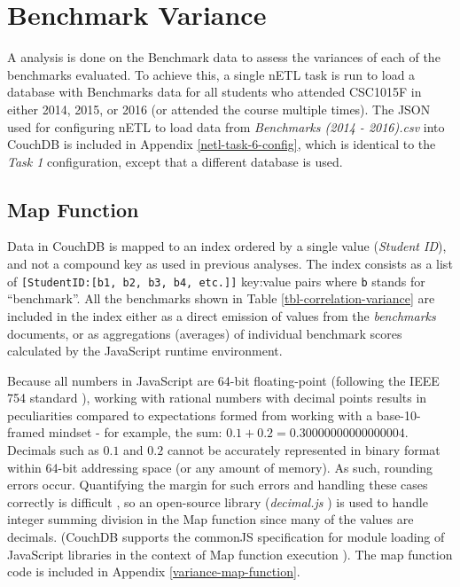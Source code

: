 \section{Benchmark Variance}
A  analysis is done on the Benchmark data to assess the variances of each of the benchmarks evaluated. To achieve this, a single nETL task is run to load a database with Benchmarks data for all students who attended CSC1015F in either 2014, 2015, or 2016 (or attended the course multiple times). The JSON used for configuring nETL to load data from \textit{Benchmarks (2014 - 2016).csv} into CouchDB is included in Appendix \ref{netl-task-6-config}, which is identical to the \textit{Task 1} configuration, except that a different database is used.

\subsection{Map Function}
Data in CouchDB is mapped to an index ordered by a single value (\textit{Student ID}), and not a compound key as used in previous analyses. The index consists as a list of \texttt{[StudentID:[b1, b2, b3, b4, etc.]]} key:value pairs where \texttt{b} stands for ``benchmark''. All the benchmarks shown in Table \ref{tbl-correlation-variance} are included in the index either as a direct emission of values from the \textit{benchmarks} documents, or as aggregations (averages) of individual benchmark scores calculated by the JavaScript runtime environment.

Because all numbers in JavaScript are 64-bit floating-point (following the IEEE 754 standard \cite{floatingPoint}), working with rational numbers with decimal points results in peculiarities compared to expectations formed from working with a base-10-framed mindset - for example, the sum: $0.1 + 0.2 = 0.30000000000000004$. Decimals such as $0.1$ and $0.2$ cannot be accurately represented in binary format within 64-bit addressing space (or any amount of memory). As such, rounding errors occur. Quantifying the margin for such errors and handling these cases correctly is difficult \cite{Goldberg1991}, so an open-source library (\textit{decimal.js} \cite{decimaljs}) is used to handle integer summing division in the Map function since many of the values are decimals. (CouchDB supports the commonJS specification for module loading of JavaScript libraries in the context of Map function execution \cite{commonJsMapFn}). The map function code is included in Appendix \ref{variance-map-function}.

